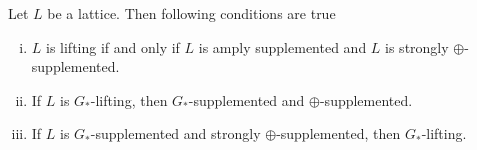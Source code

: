 \documentclass[handout]{beamer}
\begin{document}
\begin{frame}
    \begin{corollary} \label{4.2.13}
    Let $ L $ be a lattice. Then following conditions are true
        \begin{enumerate}[(i)]
            \item
                $ L $ is lifting if and only if $ L $ is amply supplemented and $ L $ is strongly $ \oplus $-supplemented.
            \item
                If $ L $ is $ G_* $-lifting, then $ G_* $-supplemented and $ \oplus $-supplemented.
            \item
                If $ L $ is $ G_* $-supplemented and strongly $ \oplus $-supplemented, then $ G_* $-lifting.
        \end{enumerate}
    \end{corollary}
\end{frame}
            
     
                
        
    
    

                
        









\end{document}
